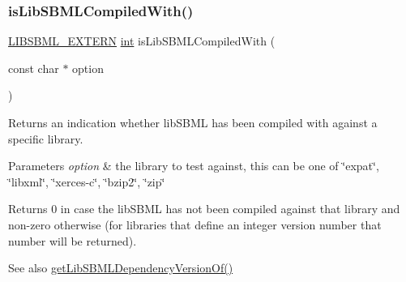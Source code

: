 \subsubsection{\texorpdfstring{is\+Lib\+S\+B\+M\+L\+Compiled\+With()}{isLibSBMLCompiledWith()}}
{\footnotesize\ttfamily \hyperlink{extern_8h_a8e9e5118f0c55d410f8bc217f2954dbf}{L\+I\+B\+S\+B\+M\+L\+\_\+\+E\+X\+T\+E\+RN} \hyperlink{lp__lib_8h_adeb9ec6400320e4923ac9d836d509ddb}{int} is\+Lib\+S\+B\+M\+L\+Compiled\+With (\begin{DoxyParamCaption}\item[{const char $\ast$}]{option }\end{DoxyParamCaption})}

Returns an indication whether lib\+S\+B\+ML has been compiled with against a specific library.


\begin{DoxyParams}{Parameters}
{\em option} & the library to test against, this can be one of \char`\"{}expat\char`\"{}, \char`\"{}libxml\char`\"{}, \char`\"{}xerces-\/c\char`\"{}, \char`\"{}bzip2\char`\"{}, \char`\"{}zip\char`\"{}\\
\hline
\end{DoxyParams}
\begin{DoxyReturn}{Returns}
0 in case the lib\+S\+B\+ML has not been compiled against that library and non-\/zero otherwise (for libraries that define an integer version number that number will be returned).
\end{DoxyReturn}
\begin{DoxySeeAlso}{See also}
\hyperlink{libsbml-version_8h_ad8c08b0c3fba5e80304ada1deaedce2f}{get\+Lib\+S\+B\+M\+L\+Dependency\+Version\+Of()} 
\end{DoxySeeAlso}
